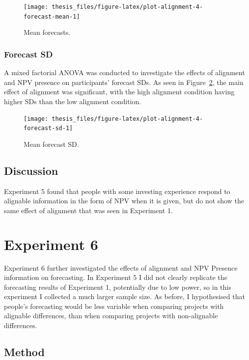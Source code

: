 \documentclass[a4paper, nobind, dvipsnames]{templates/ociamthesis}
\theoremstyle{definition}
\theoremstyle{definition}
\theoremstyle{definition}
\theoremstyle{definition}
\theoremstyle{remark}
\begin{document}
\begin{figure}
\texttt{[image: thesis\_files/figure-latex/plot-alignment-4-forecast-mean-1]} \caption{Mean forecasts.}\label{fig:plot-alignment-4-forecast-mean}
\end{figure}

\hypertarget{forecast-sd-alignment-4}{%
\subsubsection{Forecast SD}\label{forecast-sd-alignment-4}}

A mixed factorial ANOVA was conducted to investigate the effects of alignment
and NPV presence on participants' forecast SDs. As seen in
Figure~\ref{fig:plot-alignment-4-forecast-sd}, the main effect of alignment was
significant, with the high alignment condition having higher SDs than the low
alignment condition.



\begin{figure}
\texttt{[image: thesis\_files/figure-latex/plot-alignment-4-forecast-sd-1]} \caption{Mean forecast SD.}\label{fig:plot-alignment-4-forecast-sd}
\end{figure}

\subsection{Discussion}

Experiment 5 found that people with some investing experience respond to
alignable information in the form of NPV when it is given, but do not show the
same effect of alignment that was seen in Experiment 1.

\section{Experiment 6}

Experiment 6 further investigated the effects of alignment and NPV Presence
information on forecasting. In Experiment 5 I did not clearly replicate the
forecasting results of Experiment 1, potentially due to low power, so in this
experiment I collected a much larger sample size. As before, I hypothesised that
people's forecasting would be less variable when comparing projects with
alignable differences, than when comparing projects with non-alignable
differences.

\subsection{Method}
\end{document}
